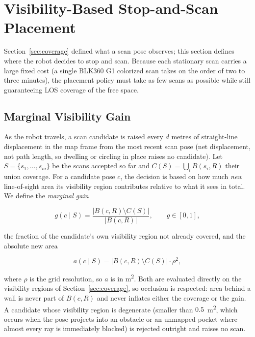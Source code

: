 \documentclass[sensors,article,submit,pdftex,moreauthors]{Definitions/mdpi}
\begin{document}
\section{Visibility-Based Stop-and-Scan Placement}
\label{sec:placement}

Section~\ref{sec:coverage} defined what a scan pose observes; this section
defines where the robot decides to stop and scan. Because each stationary scan
carries a large fixed cost (a single BLK360 G1 colorized scan takes on the order
of two to three minutes), the placement policy must take as few scans as
possible while still guaranteeing LOS coverage of the free space.

\subsection{Marginal Visibility Gain}

As the robot travels, a scan candidate is raised every $d$ metres of
straight-line displacement in the map frame from the most recent scan pose (net
displacement, not path length, so dwelling or circling in place raises no
candidate). Let $S=\{s_1,\dots,s_m\}$ be the scans accepted so far and
$C(S)=\bigcup_i B(s_i,R)$ their union coverage. For a candidate pose $c$, the
decision is based on how much \emph{new} line-of-sight area its visibility region
contributes relative to what it sees in total. We define the \emph{marginal
gain}

\begin{equation}
g(c\mid S)=\frac{\lvert B(c,R)\setminus C(S)\rvert}{\lvert B(c,R)\rvert},
\qquad g\in[0,1],
\end{equation}

the fraction of the candidate's own visibility region not already covered, and
the absolute new area

\begin{equation}
a(c\mid S)=\lvert B(c,R)\setminus C(S)\rvert\cdot\rho^2,
\end{equation}

where $\rho$ is the grid resolution, so $a$ is in m\textsuperscript{2}. Both are
evaluated directly on the visibility regions of Section~\ref{sec:coverage}, so
occlusion is respected: area behind a wall is never part of $B(c,R)$ and never
inflates either the coverage or the gain. A candidate whose visibility region is
degenerate (smaller than $0.5$~m\textsuperscript{2}, which occurs when the pose
projects into an obstacle or an unmapped pocket where almost every ray is
immediately blocked) is rejected outright and raises no scan.
\end{document}
